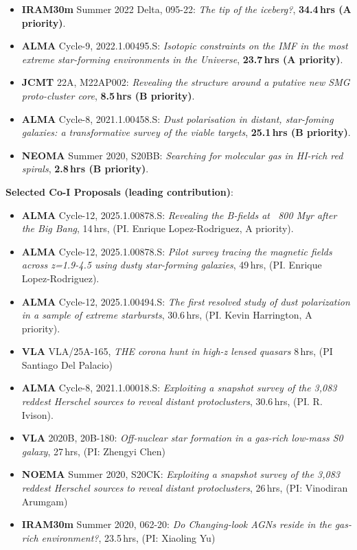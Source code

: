 \documentclass[A4,11pt]{article}
\newenvironment{paperlist}
{ \begin{itemize}[leftmargin=0.8cm, label={$\bullet$}]
    \setlength{\itemsep}{1pt}
    \setlength{\parskip}{1pt}
    \setlength{\parsep}{1pt}     }
{ \end{itemize}                  }
\begin{document}
\begin{paperlist}
  \item \textbf{IRAM30m} Summer 2022 Delta, 095-22: \emph{The tip of the iceberg?}, \textbf{34.4\,hrs (A priority)}.
  \item \textbf{ALMA} Cycle-9, 2022.1.00495.S: \emph{Isotopic constraints on the IMF in the most extreme star-forming environments in the Universe}, \textbf{23.7\,hrs (A priority)}. 
  \item \textbf{JCMT} 22A, M22AP002: \emph{Revealing the structure around a putative new SMG proto-cluster core}, \textbf{8.5\,hrs (B priority)}.
  \item \textbf{ALMA} Cycle-8, 2021.1.00458.S: \emph{Dust polarisation in distant, star-foming galaxies: a transformative survey of the viable targets}, \textbf{25.1\,hrs (B priority)}. 
  \item \textbf{NEOMA} Summer 2020, S20BB: \emph{Searching for molecular gas in HI-rich red spirals}, \textbf{2.8\,hrs (B priority)}. 
\end{paperlist}

\textbf{Selected Co-I Proposals (leading contribution)}:\\
\vspace{-0.8em}
\begin{paperlist}
    \item \textbf{ALMA} Cycle-12, 2025.1.00878.S: \emph{Revealing the B-fields at ~800 Myr after the Big Bang}, 14\,hrs, (PI. Enrique Lopez-Rodriguez, A priority).
    \item \textbf{ALMA} Cycle-12, 2025.1.00878.S: \emph{Pilot survey tracing the magnetic fields across z=1.9-4.5 using dusty star-forming galaxies}, 49\,hrs, (PI. Enrique Lopez-Rodriguez).
    \item \textbf{ALMA} Cycle-12, 2025.1.00494.S: \emph{The first resolved study of dust polarization in a sample of extreme starbursts}, 30.6\,hrs, (PI. Kevin Harrington, A priority).
    \item \textbf{VLA} VLA/25A-165, \emph{THE corona hunt in high-z lensed quasars} 8\,hrs, (PI Santiago Del Palacio)
    \item \textbf{ALMA} Cycle-8, 2021.1.00018.S: \emph{Exploiting a snapshot survey of the 3,083 reddest Herschel sources to reveal distant protoclusters}, 30.6\,hrs, (PI. R. Ivison).
    \item \textbf{VLA} 2020B, 20B-180: \emph{Off-nuclear star formation in a gas-rich low-mass S0 galaxy}, 27\,hrs, (PI: Zhengyi Chen)
    \item \textbf{NOEMA} Summer 2020, S20CK: \emph{Exploiting a snapshot survey of the 3,083 reddest Herschel sources to reveal distant protoclusters}, 26\,hrs, (PI: Vinodiran Arumgam)
    \item \textbf{IRAM30m} Summer 2020, 062-20: \emph{Do Changing-look AGNs reside in the gas-rich environment?}, 23.5\,hrs, (PI: Xiaoling Yu)
\end{paperlist}
\end{document}
